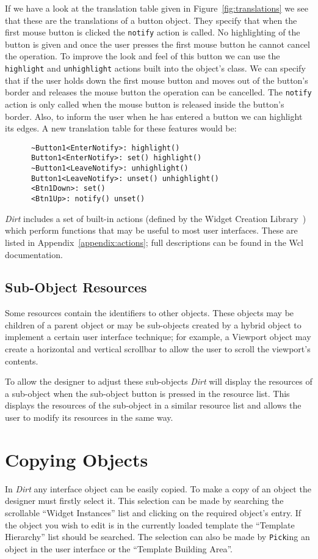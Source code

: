 If we have a look at the translation table given in
Figure~\ref{fig:translations} we see that these are the translations of a
button object.  They specify that when the first mouse button is clicked
the {\tt notify} action is called.  No highlighting of the button is given
and once the user presses the first mouse button he cannot cancel the
operation.  To improve the look and feel of this button we can use the {\tt
highlight} and {\tt unhighlight} actions built into the object's class.
We can specify that if the user holds down the first mouse button and
moves out of the button's border and releases the mouse button the operation
can be cancelled.  The {\tt notify} action is only called when the
mouse button is released inside the button's border.  Also, to inform the
user when he has entered a button we can highlight its edges.  A new
translation table for these features would be:
\begin{verbatim}
      ~Button1<EnterNotify>: highlight()
      Button1<EnterNotify>: set() highlight()
      ~Button1<LeaveNotify>: unhighlight()
      Button1<LeaveNotify>: unset() unhighlight()
      <Btn1Down>: set()
      <Btn1Up>: notify() unset()
\end{verbatim}

{\em Dirt} includes a set of built-in actions (defined by the Widget
Creation Library~\cite{Wcl}) which perform functions that
may be useful to most user interfaces. These are listed in
Appendix~\ref{appendix:actions}; full descriptions can be found in the
Wcl documentation.

\subsection{Sub-Object Resources}
\label{sec:editing-subobjects}
Some resources contain the identifiers to other objects.  These objects may be
children of a parent object or may be sub-objects created by a hybrid object
to implement a certain user interface technique; for example, a Viewport
object may create a horizontal and vertical scrollbar to allow the user to
scroll the viewport's contents.

To allow the designer to adjust these sub-objects {\em Dirt} will display the
resources of a sub-object when the sub-object button is pressed in the
resource list.  This displays the resources of the sub-object in a similar
resource list and allows the user to modify its resources in the same way.

\section{Copying Objects}
\label{sec:copying}
In {\em Dirt} any interface object can be easily copied.  To make a copy of
an object the designer must firstly select it.  This selection can be made
by searching the scrollable
``Widget Instances'' list and clicking on the required object's entry.  If
the object you wish to edit is in the currently loaded template the
``Template Hierarchy'' list should be searched.  The
selection can also be made by {\tt Pick}ing an object in the user interface or
the ``Template Building Area''.

